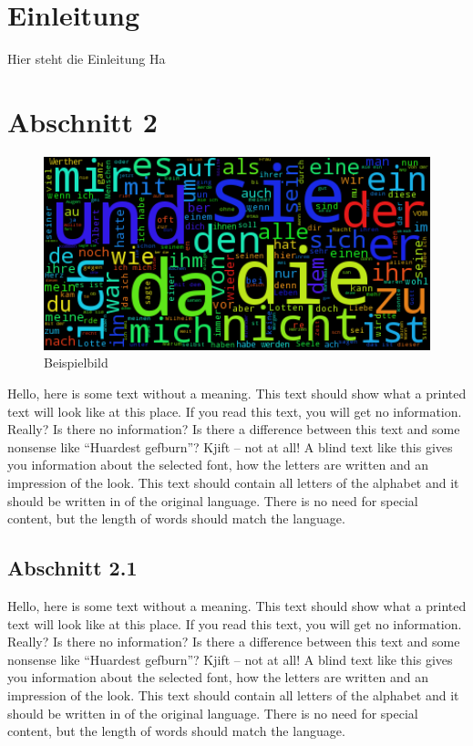 \section{Einleitung}\label{Einleitung}
Hier steht die Einleitung
Ha

\section{Abschnitt 2}\label{Abschnitt2}
\begin{figure}[hbtp]
  \centering
  \includegraphics[width=1\textwidth]{res/beispielbild.png}
  \caption{Beispielbild \citep[nach][]{beispielbild}}
  \label{fig:exintink}
\end{figure}
Hello, here is some text without a meaning. This text should show what a printed text will look like at this place. If you read this text, you will get no information. Really? Is there no information? Is there a difference between this text and some nonsense like “Huardest gefburn”? Kjift – not at all! A blind text like this gives you information about \citep[nach][]{kreidenweis} the selected font, how the letters are written and an impression of the look. This text should contain all letters of the alphabet and it should be written in of the original language. There is no need for special content, but the length of words should match the language.

\subsection{Abschnitt 2.1}\label{Abschnitt21}
Hello, here is some text without a meaning. This text should show what a printed text will look like at this place. If you read this text, you will get no information. Really? Is there no information? Is there a difference between this text and some nonsense like “Huardest gefburn”? Kjift – not at all! A blind text like this gives you information about the selected font, how the letters are written and an impression of the look. This text should contain all letters of the alphabet and it should be written in of the original language. There is no need for special content, but the length of words should match the language.

